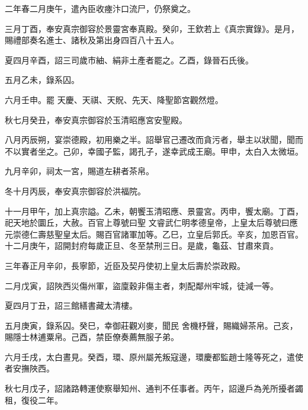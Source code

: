 \begin{pinyinscope}
 二年春二月庚午，遣內臣收瘞汴口流尸，仍祭奠之。



 三月丁酉，奉安真宗御容於景靈宮奉真殿。癸卯，王欽若上《真宗實錄》。是月，賜禮部奏名進士、諸秋及第出身四百八十五人。



 夏四月辛酉，詔三司歲市紬、絹非土產者罷之。乙酉，錄晉石氏後。



 五月乙未，錄系囚。



 六月壬申。罷
 天慶、天祺、天貺、先天、降聖節宮觀然燈。



 秋七月癸丑，奉安真宗御容於玉清昭應宮安聖殿。



 八月丙辰朔，宴崇德殿，初用樂之半。詔舉官己遷改而貪污者，舉主以狀聞，聞而不以實者坐之。己卯，幸國子監，謁孔子，遂幸武成王廟。甲申，太白入太微垣。



 九月辛卯，祠太一宮，賜道左耕者茶帛。



 冬十月丙辰，奉安真宗御容於洪福院。



 十一月甲午，加上真宗謚。乙未，朝饗玉清昭應、景靈宮。丙申，饗太廟。丁酉，祀天地於圜丘，大赦。百官上尊號曰聖
 文睿武仁明孝德皇帝，上皇太后尊號曰應元崇德仁壽慈聖皇太后。賜百官諸軍加等。乙巳，立皇后郭氏。辛亥，加恩百官。十二月庚午，詔開封府每歲正旦、冬至禁刑三日。是歲，龜茲、甘肅來貢。



 三年春正月辛卯，長寧節，近臣及契丹使初上皇太后壽於崇政殿。



 二月戊寅，詔陜西災傷州軍，盜廩穀非傷主者，刺配鄰州牢城，徒減一等。



 夏四月丁丑，詔三館繕書藏太清樓。



 五月庚寅，錄系囚。癸巳，幸御莊觀刈麥，聞民
 舍機杼聲，賜織婦茶帛。己亥，賜隱士林逋粟帛。己酉，禁臣僚奏薦無服子弟。



 六月壬戌，太白晝見。癸酉，環、原州屬羌叛寇邊，環慶都監趙士隆等死之，遣使者安撫陜西。



 秋七月戊子，詔諸路轉運使察舉知州、通判不任事者。丙午，詔邊戶為羌所擾者蠲租，復役二年。




\end{pinyinscope}

